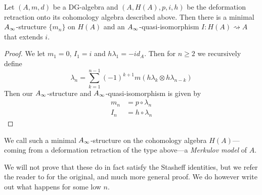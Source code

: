 \begin{theorem}
\label{thm:Kadeishvilis_theorem2}
Let $(A, m, d)$ be a DG-algebra and $(A, H(A), p, i, h)$ be the deformation retraction onto its cohomology algebra described above. Then there is a minimal $A_{\infty}$-structure $\{m_n\}$ on $H(A)$ and an $A_{\infty}$-quasi-isomorphism $I\colon H(A)\rightsquigarrow A$ that extends $i$. 
\end{theorem}
\begin{proof}
We let $m_1=0$, $I_1=i$ and $h\lambda_1 = -id_A$. Then for $n\geq 2$ we recursively define
\begin{equation*}
    \lambda_n = \sum_{k=1}^{n-1}(-1)^{k+1}m(h\lambda_k\otimes h\lambda_{n-k})
\end{equation*}
Then our $A_{\infty}$-structure and $A_{\infty}$-quasi-isomorphism is given by 
\begin{align*}
    m_n &= p\circ \lambda_n \\
    I_n &= h\circ \lambda_n
\end{align*}
\end{proof}

We call such a minimal $A_{\infty}$-structure on the cohomology algebra $H(A)$---coming from a deformation retraction of the type above---a \emph{Merkulov model} of $A$. 

We will not prove that these do in fact satisfy the Stasheff identities, but we refer the reader to \cite{kadeishvili} for the original, and much more general proof. We do however write out what happens for some low $n$. 




